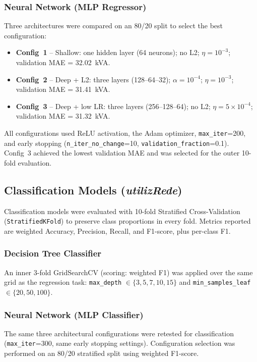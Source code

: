 \documentclass[conference]{IEEEtran}
\begin{document}
\subsubsection{Neural Network (MLP Regressor)}
Three architectures were compared on an 80/20 split to select the best configuration:
\begin{itemize}
  \item \textbf{Config~1} -- Shallow: one hidden layer (64 neurons); no L2; $\eta = 10^{-3}$; validation MAE = 32.02~kVA.
  \item \textbf{Config~2} -- Deep + L2: three layers (128--64--32); $\alpha = 10^{-4}$; $\eta = 10^{-3}$; validation MAE = 31.41~kVA.
  \item \textbf{Config~3} -- Deep + low LR: three layers (256--128--64); no L2; $\eta = 5{\times}10^{-4}$; validation MAE = 31.32~kVA.
\end{itemize}
All configurations used ReLU activation, the Adam optimizer, \texttt{max\_iter}=200, and early stopping (\texttt{n\_iter\_no\_change}=10, \texttt{validation\_fraction}=0.1). Config~3 achieved the lowest validation MAE and was selected for the outer 10-fold evaluation.

\subsection{Classification Models (\textit{utilizRede})}

Classification models were evaluated with 10-fold Stratified Cross-Validation (\texttt{StratifiedKFold}) to preserve class proportions in every fold. Metrics reported are weighted Accuracy, Precision, Recall, and F1-score, plus per-class F1.

\subsubsection{Decision Tree Classifier}
An inner 3-fold GridSearchCV (scoring: weighted F1) was applied over the same grid as the regression task: \texttt{max\_depth} $\in \{3, 5, 7, 10, 15\}$ and \texttt{min\_samples\_leaf} $\in \{20, 50, 100\}$.

\subsubsection{Neural Network (MLP Classifier)}
The same three architectural configurations were retested for classification (\texttt{max\_iter}=300, same early stopping settings). Configuration selection was performed on an 80/20 stratified split using weighted F1-score.
\end{document}
